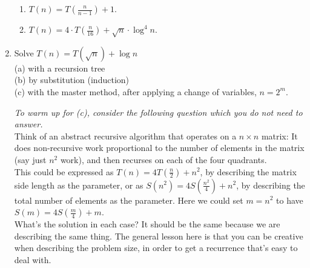 \documentclass[12pt]{article}
\begin{document}
\begin{enumerate}
\begin{enumerate}
\item $T(n) =   T(\frac{n}{n{-}1}) + 1$.\\
 
\item  $T(n) =  4\cdot T(\frac{n}{16}) + \sqrt{n}\cdot\log^4n$. \\

 \end{enumerate}



 
 
\item  Solve $T(n) = T(\sqrt{n}) + \log n$\\
(a) with a recursion tree       \\
(b) by substitution (induction)\\
(c) with the master method, after applying a change of variables, $n=2^m$. 

{\em To warm up for (c), consider the following question which you do not need to answer.
}\\
Think of an abstract recursive algorithm that operates on a  $n\times n$ matrix:  It does non-recursive work proportional to the number of elements in the matrix (say just $n^2$ work), and then recurses on each of the four quadrants. \\
This could be expressed as $T(n) = 4T(\frac{n}{2}) + n^2$, by describing the matrix side length as the parameter,
or as $S(n^2) = 4S(\frac{n^2}{4}) + n^2$, by describing the total number of elements as the parameter.  Here we could set $m=n^2$ to have $S(m) = 4S(\frac{m}{4}) + m$.\\
What's the solution in each case?  It should be the same because we are describing the same thing.  The general lesson here is that you can be creative when describing the problem size, in order to get a recurrence that's easy to deal with.\\


\end{enumerate}
\end{document}
